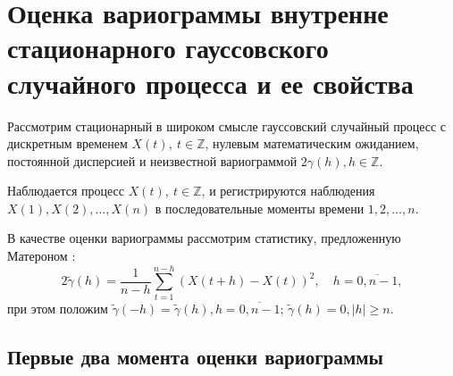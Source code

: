 
\newpage

\chapter{Оценка вариограммы внутренне стационарного гауссовского случайного процесса и ее свойства}
\label{c:variogram_estimation}

Рассмотрим стационарный в широком смысле гауссовский случайный процесс с дискретным временем $ X(t),~ t \in \mathbb{Z} $, нулевым математическим ожиданием, постоянной дисперсией и неизвестной вариограммой $ 2 \gamma(h), h \in \mathbb{Z} $.

Наблюдается процесс $ X(t),~ t \in \mathbb{Z} $, и регистрируются наблюдения $ X(1), X(2), \dots, X(n) $ в последовательные моменты времени $ 1, 2, \dots, n $.

В качестве оценки вариограммы рассмотрим статистику, предложенную Матероном \cite{matheron1980}:
\begin{equation}
\label{eq:var_estimation}
	2 \tilde{\gamma}(h) = \frac{1}{n - h} \sum_{t = 1}^{n - h}(X(t + h) - X(t))^2, \quad h = \overline{0, n - 1},
\end{equation}
при этом положим $ \tilde{\gamma}(-h) = \tilde{\gamma}(h), h = \overline{0, n - 1}$; $ \tilde{\gamma}(h) = 0, \vert h \vert \ge n $.

\section{Первые два момента оценки вариограммы} %
\label{sec:variogram_moments}

